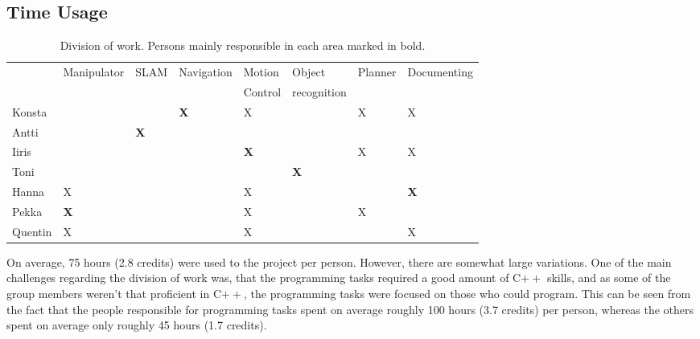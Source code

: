 \documentclass[a4paper,10pt]{article}
\begin{document}
\subsection{Time Usage}


\begin{table}[!ht]
\begin{scriptsize}
\caption{Division of work. Persons mainly responsible in each area marked in bold.}
\label{Division_of_work}
\begin{tabular}{|l|l|l|l|l|l|l|l|}
\hline
 &Manipulator&SLAM&Navigation&Motion&Object&Planner&Documenting\\

  &&&&Control&recognition&&\\
 \hline
Konsta & & & \textbf X & X & & X & X \\ \hline
Antti & & \textbf X &  &  & &  & \\ \hline
Iiris & & & & \textbf X & & X & X \\ \hline
Toni & & & & & \textbf X &  &  \\ \hline
Hanna & X & & & X & & & \textbf X \\ \hline
Pekka & \textbf X & & & X & & X & \\ \hline
Quentin & X & & & X & & & X \\ \hline
\end{tabular}
\end{scriptsize}
\end{table}


On average, 75 hours (2.8 credits) were used to the project per person. However, there are somewhat large variations. One of the main challenges regarding the division of work was, that the programming tasks required a good amount of C$++$ skills, and as some of the group members weren't that proficient in C$++$, the programming tasks were focused on those who could program. This can be seen from the fact that the people responsible for programming tasks spent on average roughly 100 hours (3.7 credits) per person, whereas the others spent on average only roughly 45 hours (1.7 credits). 
\end{document}

